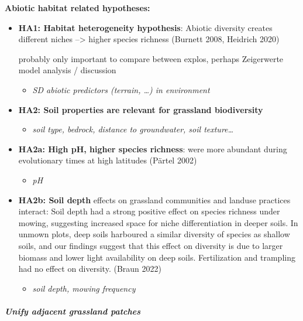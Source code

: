 \documentclass[
  letterpaper,
  DIV=11,
  numbers=noendperiod]{scrartcl}
\let\oldsubparagraph\subparagraph
\renewcommand{\subparagraph}[1]{\oldsubparagraph{#1}\mbox{}}
\providecommand{\tightlist}{%
  \setlength{\itemsep}{0pt}\setlength{\parskip}{0pt}}\usepackage{longtable,booktabs,array}
\begin{document}
\textbf{Abiotic habitat related hypotheses:}

\begin{itemize}
\item
  \textbf{HA1: Habitat heterogeneity hypothesis}: Abiotic diversity
  creates different niches --\textgreater{} higher species richness
  (Burnett 2008, Heidrich 2020)

  probably only important to compare between explos, perhaps Zeigerwerte
  model analysis / discussion

  \begin{itemize}
  \tightlist
  \item
    \emph{SD abiotic predictors (terrain, \ldots) in environment}
  \end{itemize}
\item
  \textbf{HA2: Soil properties are relevant for grassland biodiversity}

  \begin{itemize}
  \tightlist
  \item
    \emph{soil type, bedrock, distance to groundwater, soil
    texture\ldots{}}
  \end{itemize}
\item
  \textbf{HA2a: High pH, higher species richness}: were more abundant
  during evolutionary times at high latitudes (Pärtel 2002)

  \begin{itemize}
  \tightlist
  \item
    \emph{pH}
  \end{itemize}
\item
  \textbf{HA2b: Soil depth} effects on grassland communities and landuse
  practices interact: Soil depth had a strong positive effect on species
  richness under mowing, suggesting increased space for niche
  differentiation in deeper soils. In unmown plots, deep soils harboured
  a similar diversity of species as shallow soils, and our findings
  suggest that this effect on diversity is due to larger biomass and
  lower light availability on deep soils. Fertilization and trampling
  had no effect on diversity. (Braun 2022)~

  \begin{itemize}
  \tightlist
  \item
    \emph{soil depth, mowing frequency}
  \end{itemize}
\end{itemize}

\hypertarget{unify-adjacent-grassland-patches}{%
\subparagraph{Unify adjacent grassland
patches}\label{unify-adjacent-grassland-patches}}
\end{document}
